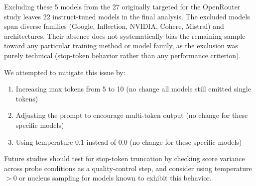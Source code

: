 Excluding these 5 models from the 27 originally targeted for the OpenRouter study leaves 22 instruct-tuned models in the final analysis. The excluded models span diverse families (Google, Inflection, NVIDIA, Cohere, Mistral) and architectures. Their absence does not systematically bias the remaining sample toward any particular training method or model family, as the exclusion was purely technical (stop-token behavior rather than any performance criterion).

We attempted to mitigate this issue by:
\begin{enumerate}
    \item Increasing max tokens from 5 to 10 (no change  all models still emitted single tokens)
    \item Adjusting the prompt to encourage multi-token output (no change for these specific models)
    \item Using temperature 0.1 instead of 0.0 (no change for these specific models)
\end{enumerate}

Future studies should test for stop-token truncation by checking score variance across probe conditions as a quality-control step, and consider using temperature $> 0$ or nucleus sampling for models known to exhibit this behavior.
